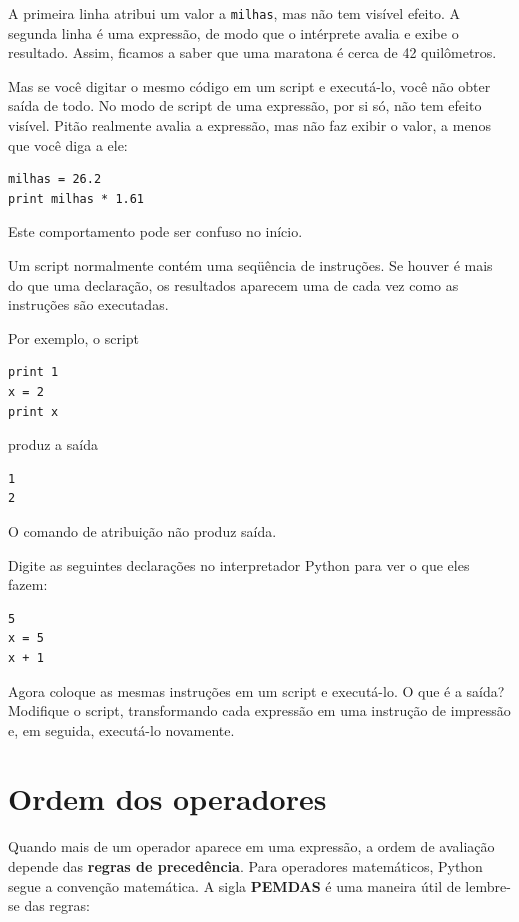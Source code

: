 \documentclass[10pt]{book}
\begin{document}
A primeira linha atribui um valor a {\tt milhas}, mas não tem visível
efeito. A segunda linha é uma expressão, de modo que o intérprete
avalia e exibe o resultado. Assim, ficamos a saber que uma maratona é
cerca de 42 quilômetros.

Mas se você digitar o mesmo código em um script e executá-lo, você não obter
saída de todo. No modo de script de uma expressão, por si só, não tem
efeito visível. Pitão realmente avalia a expressão, mas não faz
exibir o valor, a menos que você diga a ele:

\begin{verbatim}
milhas = 26.2
print milhas * 1.61
\end{verbatim}

Este comportamento pode ser confuso no início.

Um script normalmente contém uma seqüência de instruções. Se houver
é mais do que uma declaração, os resultados aparecem uma de cada vez
como as instruções são executadas.

Por exemplo, o script

\begin{verbatim}
print 1
x = 2
print x
\end{verbatim}
%
produz a saída

\begin{verbatim}
1
2
\end{verbatim}
%
O comando de atribuição não produz saída.

\begin{exercise}

Digite as seguintes declarações no interpretador Python para ver
o que eles fazem:

\begin{verbatim}
5
x = 5
x + 1
\end{verbatim}
%
Agora coloque as mesmas instruções em um script e executá-lo. O que
é a saída? Modifique o script, transformando cada
expressão em uma instrução de impressão e, em seguida, executá-lo novamente.
\end{exercise}


\section{Ordem dos operadores}

Quando mais de um operador aparece em uma expressão, a ordem de
avaliação depende das {\bf regras de precedência}. Para
operadores matemáticos, Python segue a convenção matemática.
A sigla {\bf PEMDAS} é uma maneira útil de
lembre-se das regras:
\end{document}
